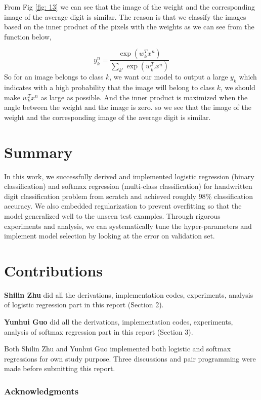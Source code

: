 \documentclass{article} %
\begin{document}
From Fig \ref{fig: 13} we can see that the image of the weight and the corresponding image of the average digit is similar. The reason is that we classify the images based on the inner product of the pixels with the weights as we can see from the function below,

\begin{equation}
y_k^n = \frac{\exp{( w_k^Tx^n)}}{ \sum_{k'}\exp{(w_{k'}^Tx^n)}}
\end{equation}
So for an image belongs to class $k$, we want our model to output a large $y_k$ which indicates with a high probability that the image will belong to class $k$, we should make $w_k^Tx^n$ as large as possible. And the inner product is maximized when the angle between the weight and the image is zero. so we see that the image of the weight and the corresponding image of the average digit is similar.


\section{Summary}
In this work, we successfully derived and implemented logistic regression (binary classification) and softmax regression (multi-class classification) for handwritten digit classification problem from scratch and achieved roughly $98\%$ classification accuracy. We also embedded regularization to prevent overfitting so that the model generalized well to the unseen test examples. Through rigorous experiments and analysis, we can systematically tune the hyper-parameters and implement model selection by looking at the error on validation set. 

\section{Contributions}
\textbf{Shilin Zhu} did all the derivations, implementation codes, experiments, analysis of logistic regression part in this report (Section 2). 

\textbf{Yunhui Guo} did all the derivations, implementation codes, experiments, analysis of softmax regression part in this report (Section 3). 

Both Shilin Zhu and Yunhui Guo implemented both logistic and softmax regressions for own study purpose. Three discussions and pair programming were made before submitting this report.

\subsubsection*{Acknowledgments}
\end{document}
